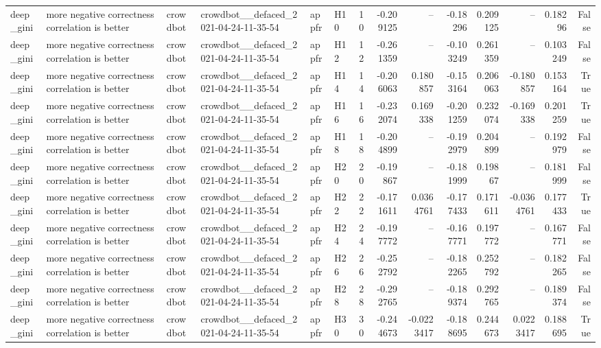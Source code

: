 \begin{longtable}{llllllrrrrrrrr}
deep\_gini & more negative correctness correlation is better & crowdbot & crowdbot\_\_defaced\_2021-04-24-11-35-54 & appfr & H10 & 10 & -0.209125 & -- & -0.18296 & 0.209125 & -- & 0.18296 & False \\
deep\_gini & more negative correctness correlation is better & crowdbot & crowdbot\_\_defaced\_2021-04-24-11-35-54 & appfr & H12 & 12 & -0.261359 & -- & -0.103249 & 0.261359 & -- & 0.103249 & False \\
deep\_gini & more negative correctness correlation is better & crowdbot & crowdbot\_\_defaced\_2021-04-24-11-35-54 & appfr & H14 & 14 & -0.206063 & 0.180857 & -0.153164 & 0.206063 & -0.180857 & 0.153164 & True \\
deep\_gini & more negative correctness correlation is better & crowdbot & crowdbot\_\_defaced\_2021-04-24-11-35-54 & appfr & H16 & 16 & -0.232074 & 0.169338 & -0.201259 & 0.232074 & -0.169338 & 0.201259 & True \\
deep\_gini & more negative correctness correlation is better & crowdbot & crowdbot\_\_defaced\_2021-04-24-11-35-54 & appfr & H18 & 18 & -0.204899 & -- & -0.192979 & 0.204899 & -- & 0.192979 & False \\
deep\_gini & more negative correctness correlation is better & crowdbot & crowdbot\_\_defaced\_2021-04-24-11-35-54 & appfr & H20 & 20 & -0.19867 & -- & -0.181999 & 0.19867 & -- & 0.181999 & False \\
deep\_gini & more negative correctness correlation is better & crowdbot & crowdbot\_\_defaced\_2021-04-24-11-35-54 & appfr & H22 & 22 & -0.171611 & 0.0364761 & -0.177433 & 0.171611 & -0.0364761 & 0.177433 & True \\
deep\_gini & more negative correctness correlation is better & crowdbot & crowdbot\_\_defaced\_2021-04-24-11-35-54 & appfr & H24 & 24 & -0.197772 & -- & -0.167771 & 0.197772 & -- & 0.167771 & False \\
deep\_gini & more negative correctness correlation is better & crowdbot & crowdbot\_\_defaced\_2021-04-24-11-35-54 & appfr & H26 & 26 & -0.252792 & -- & -0.182265 & 0.252792 & -- & 0.182265 & False \\
deep\_gini & more negative correctness correlation is better & crowdbot & crowdbot\_\_defaced\_2021-04-24-11-35-54 & appfr & H28 & 28 & -0.292765 & -- & -0.189374 & 0.292765 & -- & 0.189374 & False \\
deep\_gini & more negative correctness correlation is better & crowdbot & crowdbot\_\_defaced\_2021-04-24-11-35-54 & appfr & H30 & 30 & -0.244673 & -0.0223417 & -0.188695 & 0.244673 & 0.0223417 & 0.188695 & True \\

\end{longtable}
